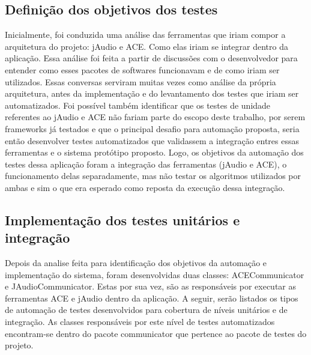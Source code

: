\subsection{Definição dos objetivos dos testes}

Inicialmente, foi conduzida uma análise das ferramentas que iriam compor a arquitetura do projeto: jAudio e ACE. Como elas iriam se integrar dentro da aplicação. Essa análise foi feita a partir de discussões com o desenvolvedor para entender como esses pacotes de softwares funcionavam e de como iriam ser utilizados. Essas conversas serviram muitas vezes como análise da própria arquitetura, antes da implementação e do levantamento dos testes que iriam ser automatizados. Foi possível também identificar que os testes de unidade referentes ao jAudio e ACE não fariam parte do escopo deste trabalho, por serem frameworks já testados e que o principal desafio para automação proposta, seria então desenvolver testes automatizados que validassem a integração entres essas ferramentas e o sistema protótipo proposto. Logo, os objetivos da automação dos testes dessa aplicação foram a integração das ferramentas (jAudio e ACE), o funcionamento delas separadamente, mas não testar os algoritmos utilizados por ambas e sim o que era esperado como reposta da execução dessa integração.

\subsection{Implementação dos testes unitários e integração}

Depois da analise feita para identificação dos objetivos da automação e implementação do sistema, foram desenvolvidas duas classes: ACECommunicator e JAudioCommunicator. Estas por sua vez, são as responsáveis por executar as ferramentas ACE e jAudio dentro da aplicação. A seguir, serão listados os tipos de automação de testes desenvolvidos para cobertura de níveis unitários e de integração. As classes responsáveis por este nível de testes automatizados encontram-se dentro do pacote communicator que pertence ao pacote de testes do projeto.  

